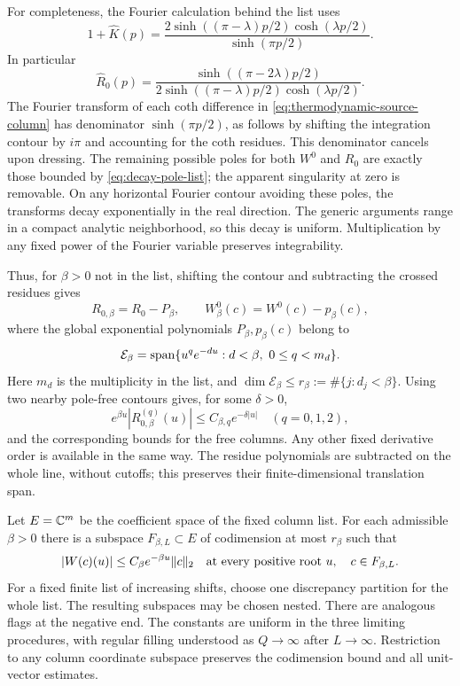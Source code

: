 For completeness, the Fourier calculation behind the list uses
\[
 1+\widehat K(p)
 =\frac{2\sinh((\pi-\lambda)p/2)\cosh(\lambda p/2)}
        {\sinh(\pi p/2)}.
\]
In particular
\[
 \widehat R_0(p)=
 \frac{\sinh((\pi-2\lambda)p/2)}
      {2\sinh((\pi-\lambda)p/2)\cosh(\lambda p/2)}.
\]
The Fourier transform of each coth difference in
\eqref{eq:thermodynamic-source-column} has denominator
$\sinh(\pi p/2)$, as follows by shifting the integration contour
by $i\pi$ and accounting for the coth residues.
This denominator cancels upon dressing.  The remaining possible
poles for both $W^0$ and $R_0$ are exactly those bounded by
\eqref{eq:decay-pole-list}; the apparent singularity at zero is
removable.  On any horizontal Fourier contour avoiding these
poles, the transforms decay exponentially in the real direction.
The generic arguments range in a compact analytic neighborhood,
so this decay is uniform.  Multiplication by any fixed power of
the Fourier variable preserves integrability.

Thus, for $\beta>0$ not in the list, shifting the contour and
subtracting the crossed residues gives
\[
 R_{0,\beta}=R_0-P_\beta,\qquad
 W^0_\beta(c)=W^0(c)-p_\beta(c),
\]
where the global exponential polynomials $P_\beta,p_\beta(c)$
belong to
\begin{equation}\label{eq:residue-space}
 \mathcal E_\beta
 =\operatorname{span}\{u^q e^{-du}:d<\beta,\ 0\le q<m_d\}.
\end{equation}
Here $m_d$ is the multiplicity in the list, and
$\dim\mathcal E_\beta\le r_\beta:=\#\{j:d_j<\beta\}$.
Using two nearby pole-free contours gives, for some $\delta>0$,
\begin{equation}\label{eq:shifted-kernel-envelope}
 e^{\beta u}|R_{0,\beta}^{(q)}(u)|
       \le C_{\beta,q}e^{-\delta|u|}
 \quad(q=0,1,2),
\end{equation}
and the corresponding bounds for the free columns.
Any other fixed derivative order is available in the same way.
The residue polynomials are subtracted on the whole line, without
cutoffs; this preserves their finite-dimensional translation span.

\begin{lemma}\label{lem:weighted-flags}
Let $E=\mathbb C^m$ be the coefficient space of the fixed column list.
For each admissible $\beta>0$ there is a subspace
$F_{\beta,L}\subset E$ of codimension at most $r_\beta$
such that
\begin{equation}\label{eq:weighted-node-decay}
 |W(c)(u)|\le C_\beta e^{-\beta u}\|c\|_2
 \quad\hbox{at every positive root }u,\quad c\in F_{\beta,L}.
\end{equation}
For a fixed finite list of increasing shifts, choose one discrepancy
partition for the whole list. The resulting subspaces may be chosen
nested.  There are analogous flags at the negative end.
The constants are uniform in the three limiting procedures,
with regular filling understood as $Q\to\infty$ after $L\to\infty$.
Restriction to any column coordinate subspace preserves the
codimension bound and all unit-vector estimates.
\end{lemma}

